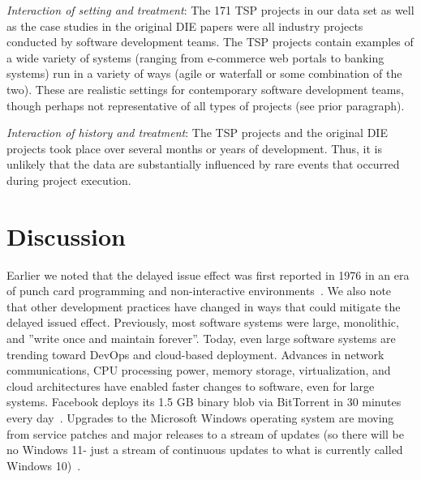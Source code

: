\documentclass[smallcondensed]{svjour3}
\begin{document}
\textit{Interaction of setting and treatment}: The 171 TSP projects in our data set as well as the case studies in the original DIE papers were all industry projects conducted by software development teams. The TSP projects contain examples of a wide variety
 of systems (ranging from e-commerce web portals to  banking systems) run in a variety of
 ways (agile or  waterfall or some combination of the two). These are realistic settings for contemporary software development teams, though perhaps not representative of all types of projects (see prior paragraph). 


\textit{Interaction of history and treatment}: The TSP projects and the original DIE projects took place over several months or years of development. Thus, it is unlikely that the data are substantially influenced by rare events that occurred during project execution.


 
 \section{Discussion}
 \label{sect:discussion}

Earlier we noted that the delayed issue effect was first reported in 1976 in an era of punch card programming and non-interactive environments~\cite{Boehm76}. We also note that other development practices have changed in ways that could   mitigate the delayed issued effect.  Previously,
most software systems were large, monolithic, and ''write once and maintain
forever''. Today, even large software systems are trending toward DevOps and cloud-based deployment. Advances in network communications, CPU processing power, memory storage, virtualization, and cloud architectures have enabled faster changes to software, even for large systems. Facebook deploys its 1.5 GB binary blob via BitTorrent in 30 minutes every day~\cite{Facebook}. 
Upgrades to the Microsoft Windows operating system are moving from service patches and major releases to a stream of updates (so there will be no Windows 11- just a stream of continuous updates to what is currently called Windows 10)~\cite{bright15}.
\end{document}
